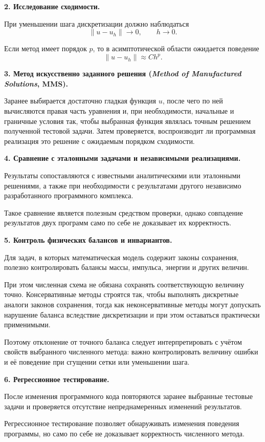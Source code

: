 \textbf{2. Исследование сходимости.}

При уменьшении шага дискретизации должно наблюдаться
\[
\|u-u_h\|\rightarrow0,
\qquad h\rightarrow0.
\]

Если метод имеет порядок $p$, то в асимптотической области ожидается поведение
\[
\|u-u_h\|\approx Ch^p.
\]

\textbf{3. Метод искусственно заданного решения (\textit{Method of Manufactured Solutions}, MMS).}

Заранее выбирается достаточно гладкая функция $u$, после чего по ней вычисляются правая часть уравнения и, при необходимости, начальные и граничные условия так, чтобы выбранная функция являлась точным решением полученной тестовой задачи. Затем проверяется, воспроизводит ли программная реализация это решение с ожидаемым порядком сходимости.

\textbf{4. Сравнение с эталонными задачами и независимыми реализациями.}

Результаты сопоставляются с известными аналитическими или эталонными решениями, а также при необходимости с результатами другого независимо разработанного программного комплекса.

Такое сравнение является полезным средством проверки, однако совпадение результатов двух программ само по себе не доказывает их корректность.

\textbf{5. Контроль физических балансов и инвариантов.}

Для задач, в которых математическая модель содержит законы сохранения, полезно контролировать балансы массы, импульса, энергии и других величин.

При этом численная схема не обязана сохранять соответствующую величину точно. Консервативные методы строятся так, чтобы выполнять дискретные аналоги законов сохранения, тогда как неконсервативные методы могут допускать нарушение баланса вследствие дискретизации и при этом оставаться практически применимыми.

Поэтому отклонение от точного баланса следует интерпретировать с учётом свойств выбранного численного метода: важно контролировать величину ошибки и её поведение при сгущении сетки или уменьшении шага.

\textbf{6. Регрессионное тестирование.}

После изменения программного кода повторяются заранее выбранные тестовые задачи и проверяется отсутствие непреднамеренных изменений результатов.

Регрессионное тестирование позволяет обнаруживать изменения поведения программы, но само по себе не доказывает корректность численного метода.

